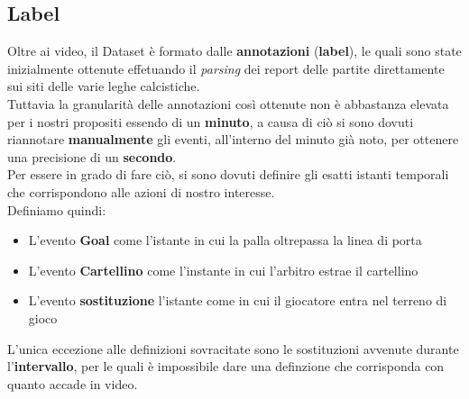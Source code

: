 \subsection{Label}
Oltre ai video, il Dataset è formato dalle \textbf{annotazioni} (\textbf{label}), le quali sono state inizialmente ottenute effetuando il \textit{parsing} dei report delle partite direttamente sui siti delle varie leghe calcistiche.
\\Tuttavia la granularità delle annotazioni così ottenute non è abbastanza elevata per i nostri propositi essendo di un \textbf{minuto}, a causa di ciò si sono dovuti riannotare \textbf{manualmente} gli eventi, all'interno del minuto già noto, per ottenere una precisione di un \textbf{secondo}.
\\Per essere in grado di fare ciò, si sono dovuti definire gli esatti istanti temporali che corrispondono alle azioni di nostro interesse.
\\Definiamo quindi:
\begin{itemize}
\item L'evento \textbf{Goal} come l'istante in cui la palla oltrepassa la linea di porta
\item L'evento \textbf{Cartellino} come l'instante in cui l'arbitro estrae il cartellino
\item L'evento \textbf{sostituzione} l'istante come in cui il giocatore entra nel terreno di gioco
\end{itemize}
L'unica eccezione alle definizioni sovracitate sono le sostituzioni avvenute durante l'\textbf{intervallo}, per le quali è impossibile dare una definzione che corrisponda con quanto accade in video.
